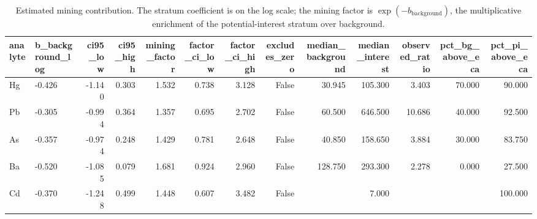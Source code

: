 \begin{table}[htbp]
\centering
\caption{Estimated mining contribution. The stratum coefficient is on the log scale; the mining factor is $\exp(-b_{\mathrm{background}})$, the multiplicative enrichment of the potential-interest stratum over background.}
\label{tab:background}
\footnotesize
\begin{tabular}{llrrrrrrrrrrr}
\toprule
analyte & b\_background\_log & ci95\_low & ci95\_high & mining\_factor & factor\_ci\_low & factor\_ci\_high & excludes\_zero & median\_background & median\_interest & observed\_ratio & pct\_bg\_above\_eca & pct\_pi\_above\_eca \\
\midrule
Hg & -0.426 & -1.140 & 0.303 & 1.532 & 0.738 & 3.128 & False & 30.945 & 105.300 & 3.403 & 70.000 & 90.000 \\
Pb & -0.305 & -0.994 & 0.364 & 1.357 & 0.695 & 2.702 & False & 60.500 & 646.500 & 10.686 & 40.000 & 92.500 \\
As & -0.357 & -0.974 & 0.248 & 1.429 & 0.781 & 2.648 & False & 40.850 & 158.650 & 3.884 & 30.000 & 83.750 \\
Ba & -0.520 & -1.085 & 0.079 & 1.681 & 0.924 & 2.960 & False & 128.750 & 293.300 & 2.278 & 0.000 & 27.500 \\
Cd & -0.370 & -1.248 & 0.499 & 1.448 & 0.607 & 3.482 & False &  & 7.000 &  &  & 100.000 \\
\bottomrule
\end{tabular}
\end{table}
